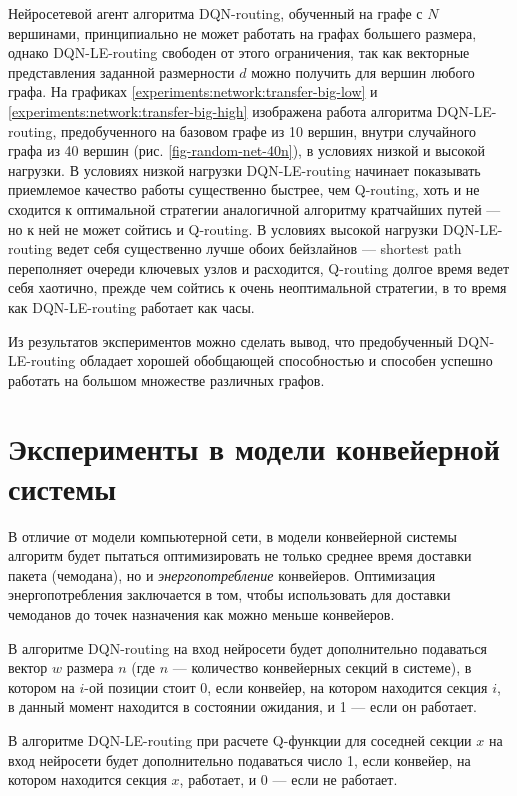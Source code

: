 \documentclass[specification,annotation,times]{itmo-student-thesis}
\theoremstyle{definition}
\begin{document}
Нейросетевой агент алгоритма DQN-routing, обученный на графе с $N$ вершинами,
принципиально не может работать на графах большего размера, однако
DQN-LE-routing свободен от этого ограничения, так как векторные представления
заданной размерности $d$ можно получить для вершин любого графа. На графиках
\ref{experiments:network:transfer-big-low} и
\ref{experiments:network:transfer-big-high} изображена работа алгоритма
DQN-LE-routing, предобученного на базовом графе из 10 вершин, внутри случайного
графа из 40 вершин (рис. \ref{fig-random-net-40n}), в условиях низкой и высокой
нагрузки. В условиях низкой нагрузки DQN-LE-routing начинает показывать
приемлемое качество работы существенно быстрее, чем Q-routing, хоть и не
сходится к оптимальной стратегии аналогичной алгоритму кратчайших путей --- но к
ней не может сойтись и Q-routing. В условиях высокой нагрузки DQN-LE-routing
ведет себя существенно лучше обоих бейзлайнов --- shortest path переполняет
очереди ключевых узлов и расходится, Q-routing долгое время ведет себя хаотично,
прежде чем сойтись к очень неоптимальной стратегии, в то время как
DQN-LE-routing работает как часы.

Из результатов экспериментов можно сделать вывод, что предобученный DQN-LE-routing обладает
хорошей обобщающей способностью и способен успешно работать на большом множестве
различных графов.

\section{Эксперименты в модели конвейерной системы}\label{experiments:conveyors}

В отличие от модели компьютерной сети, в модели конвейерной системы алгоритм
будет пытаться оптимизировать не только среднее время доставки пакета
(чемодана), но и \textit{энергопотребление} конвейеров. Оптимизация
энергопотребления заключается в том, чтобы использовать для доставки чемоданов
до точек назначения как можно меньше конвейеров.

В алгоритме DQN-routing на вход нейросети будет дополнительно подаваться вектор
$w$ размера $n$ (где $n$ --- количество конвейерных секций в системе), в котором на $i$-ой
позиции стоит 0, если конвейер, на котором находится секция $i$, в данный момент
находится в состоянии ожидания, и 1 --- если он работает.

В алгоритме DQN-LE-routing при расчете Q-функции для соседней секции $x$ на вход
нейросети будет дополнительно подаваться число 1, если конвейер, на котором
находится секция $x$, работает, и 0 --- если не работает.
\end{document}
